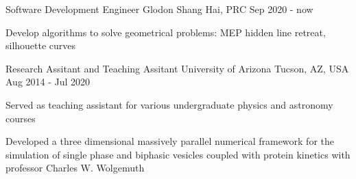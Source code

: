   
  \cventry
    {Software Development Engineer} %
    {Glodon} %
    {Shang Hai, PRC} %
    {Sep 2020 - now} %
    {
      \begin{cvitems} %
         \item {Develop algorithms to solve geometrical problems: MEP hidden line retreat, silhouette curves}    
      \end{cvitems}
    }
    
  \cventry
    {Research Assitant and Teaching Assitant} %
    {University of Arizona} %
    {Tucson, AZ, USA} %
    {Aug 2014 - Jul 2020} %
    {
      \begin{cvitems} %
         \item {Served as teaching assistant for various undergraduate physics and astronomy courses}
         \item {Developed a three dimensional massively parallel numerical framework for the simulation of single phase and biphasic vesicles coupled with protein kinetics with professor Charles W. Wolgemuth}
      \end{cvitems}
    }
  

